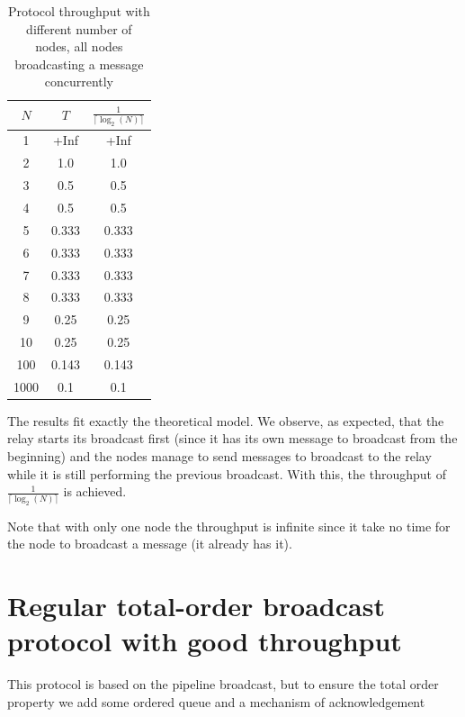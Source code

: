 \documentclass[a4paper]{article}
\begin{document}
\begin{table}[H]
    \centering
    \begin{tabular}{|c|c|c|}
        \hline
        $N$   & $T$  & $\frac{1}{\lceil\log_2(N)\rceil}$ \\
        \hline
        1     & +Inf   & +Inf   \\
        2     & 1.0    & 1.0    \\
        3     & 0.5    & 0.5    \\
        4     & 0.5    & 0.5    \\
        5     & 0.333  & 0.333  \\
        6     & 0.333  & 0.333  \\
        7     & 0.333  & 0.333  \\
        8     & 0.333  & 0.333  \\
        9     & 0.25   & 0.25   \\
        10    & 0.25   & 0.25   \\
        100   & 0.143  & 0.143  \\
        1000  & 0.1    & 0.1    \\
        \hline
    \end{tabular}
    \caption{Protocol throughput with different number of nodes, all nodes broadcasting a message concurrently}
    \label{table:thr}
\end{table}

The results fit exactly the theoretical model. We observe, as expected, that
the relay starts its broadcast first (since it has its own message to
broadcast from the beginning) and the nodes manage to send messages to
broadcast to the relay while it is still performing the previous broadcast.
With this, the throughput of $\frac{1}{\lceil\log_2(N)\rceil}$ is achieved.

Note that with only one node the throughput is infinite since it take no time
for the node to broadcast a message (it already has it).

\section{Regular total-order broadcast protocol with good throughput}
\label{sec:throughputTO}
This protocol is based on the pipeline broadcast, but to ensure the total order
property we add some ordered queue and a mechanism of acknowledgement
\end{document}
